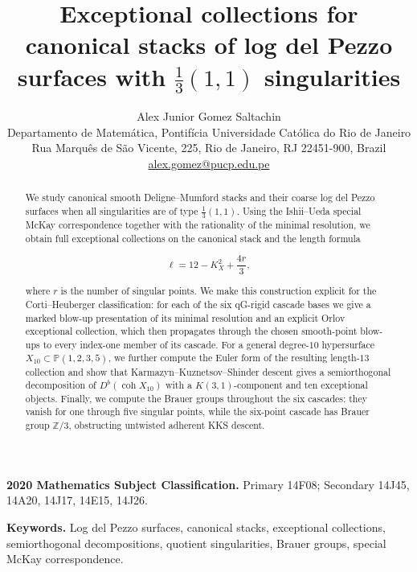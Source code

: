 \documentclass[11pt]{article}
\theoremstyle{plain}
\theoremstyle{definition}
\theoremstyle{remark}
\begin{document}
\title{Exceptional collections for canonical stacks of log del Pezzo surfaces with \texorpdfstring{$\frac13(1,1)$}{1/3(1,1)} singularities}
\author{Alex Junior Gomez Saltachin\\[0.5em]
\small Departamento de Matem\'atica, Pontif\'icia Universidade Cat\'olica do Rio de Janeiro\\
\small Rua Marqu\^es de S\~ao Vicente, 225, Rio de Janeiro, RJ 22451-900, Brazil\\
\small \href{mailto:alex.gomez@pucp.edu.pe}{alex.gomez@pucp.edu.pe}}
\date{}

\maketitle

\begin{abstract}
We study canonical smooth Deligne--Mumford stacks and their coarse log del Pezzo surfaces when all singularities are of type \(\frac13(1,1)\). Using the Ishii--Ueda special McKay correspondence together with the rationality of the minimal resolution, we obtain full exceptional collections on the canonical stack and the length formula

$$
\ell=12-K_X^2+\frac{4r}{3},
$$

where \(r\) is the number of singular points. We make this construction explicit for the Corti--Heuberger classification: for each of the six qG-rigid cascade bases we give a marked blow-up presentation of its minimal resolution and an explicit Orlov exceptional collection, which then propagates through the chosen smooth-point blow-ups to every index-one member of its cascade. For a general degree-\(10\) hypersurface \(X_{10}\subset\mathbb P(1,2,3,5)\), we further compute the Euler form of the resulting length-\(13\) collection and show that Karmazyn--Kuznetsov--Shinder descent gives a semiorthogonal decomposition of \(D^b(\operatorname{coh}X_{10})\) with a \(K(3,1)\)-component and ten exceptional objects. Finally, we compute the Brauer groups throughout the six cascades: they vanish for one through five singular points, while the six-point cascade has Brauer group \(\mathbb Z/3\), obstructing untwisted adherent KKS descent.
\end{abstract}

\medskip
\noindent\textbf{2020 Mathematics Subject Classification.}
Primary 14F08; Secondary 14J45, 14A20, 14J17, 14E15, 14J26.

\smallskip
\noindent\textbf{Keywords.}
Log del Pezzo surfaces, canonical stacks, exceptional collections, semiorthogonal decompositions, quotient singularities, Brauer groups, special McKay correspondence.
\end{document}
